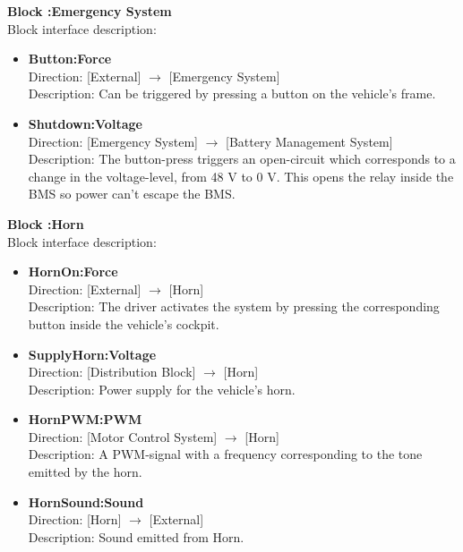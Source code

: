 \textbf{Block :Emergency System}\\
Block interface description:
\begin{itemize}
	\item \textbf{Button:Force}\\
	Direction: [External] $\rightarrow$ [Emergency System]\\
	Description: Can be triggered by pressing a button on the vehicle's frame.
	\item \textbf{Shutdown:Voltage}\\
	Direction: [Emergency System] $\rightarrow$ [Battery Management System]\\
	Description: The button-press triggers an open-circuit which corresponds to a change in the voltage-level, from 48 V to 0 V. This opens the relay inside the BMS so power can't escape the BMS.
\end{itemize}

\textbf{Block :Horn}\\
Block interface description:
\begin{itemize}
	\item \textbf{HornOn:Force}\\
	Direction: [External] $\rightarrow$ [Horn]\\
	Description: The driver activates the system by pressing the corresponding button inside the vehicle's cockpit.
	\item \textbf{SupplyHorn:Voltage}\\
	Direction: [Distribution Block] $\rightarrow$ [Horn]\\
	Description: Power supply for the vehicle's horn.
	\item \textbf{HornPWM:PWM}\\
	Direction: [Motor Control System] $\rightarrow$ [Horn]\\
	Description: A PWM-signal with a frequency corresponding to the tone emitted by the horn.
	\item \textbf{HornSound:Sound}\\
	Direction: [Horn] $\rightarrow$ [External]\\
	Description: Sound emitted from Horn.
\end{itemize}

